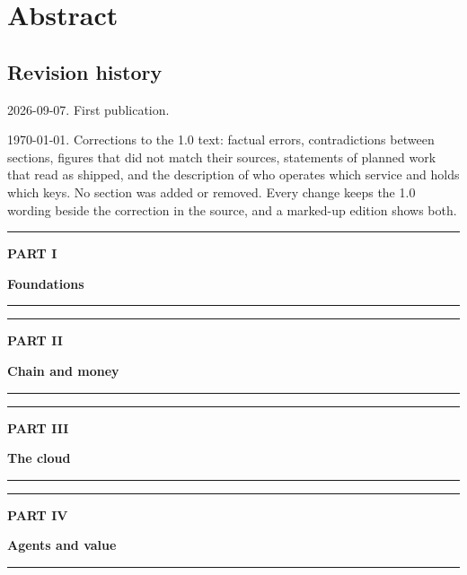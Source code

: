 \documentclass[11pt,a4paper]{article}
\newcommand{\fluxpart}[2]{%
  \clearpage
  \thispagestyle{empty}%
  \vspace*{0.28\textheight}%
  {\raggedright
   {\color{FluxRule}\rule{\linewidth}{1.2pt}}\par\vspace{1.35em}
   {\normalsize\bfseries\color{FluxSlate}\MakeUppercase{#1}}\par\vspace{0.7em}
   {\fontsize{30}{34}\selectfont\bfseries\color{FluxBlue} #2}\par\vspace{1.35em}
   {\color{FluxRule}\rule{\linewidth}{1.2pt}}\par}
  \clearpage}
\DeclareRobustCommand{\_}{\ifmmode\mbox{\textunderscore}\else\textunderscore\allowbreak\fi}
\begin{document}
\clearpage
\thispagestyle{plain}
\section*{Abstract}


\vspace{1.5em}
\subsection*{Revision history}
\begin{description}[leftmargin=4.2em,style=sameline,itemsep=0.2em]
  \item[1.0] 2026-09-07. First publication.
  \item[1.0.1] \today. Corrections to the 1.0 text: factual errors, contradictions between sections,
    figures that did not match their sources, statements of planned work that read as shipped, and the
    description of who operates which service and holds which keys. No section was added or removed.
    Every change keeps the 1.0 wording beside the correction in the source, and a marked-up edition
    shows both.
\end{description}

\clearpage
{}
\tableofcontents
\cleardoublepage

\fluxpart{Part I}{Foundations}




\fluxpart{Part II}{Chain and money}






\fluxpart{Part III}{The cloud}







\fluxpart{Part IV}{Agents and value}









\end{document}

